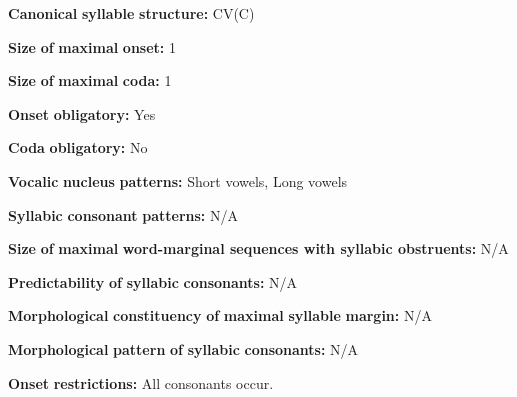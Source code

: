 \begin{styleBody}
\textbf{Canonical} \textbf{syllable} \textbf{structure:} CV(C) \citep[27-28]{Givón2011}
\end{styleBody}

\begin{styleBody}
\textbf{Size} \textbf{of} \textbf{maximal} \textbf{onset:} 1
\end{styleBody}

\begin{styleBody}
\textbf{Size} \textbf{of} \textbf{maximal} \textbf{coda:} 1
\end{styleBody}

\begin{styleBody}
\textbf{Onset} \textbf{obligatory:} Yes
\end{styleBody}

\begin{styleBody}
\textbf{Coda} \textbf{obligatory:} No
\end{styleBody}

\begin{styleBody}
\textbf{Vocalic} \textbf{nucleus} \textbf{patterns:} Short vowels, Long vowels
\end{styleBody}

\begin{styleBody}
\textbf{Syllabic} \textbf{consonant} \textbf{patterns:} N/A
\end{styleBody}

\begin{styleBody}
\textbf{Size} \textbf{of} \textbf{maximal} \textbf{word{}-marginal sequences with syllabic obstruents:} N/A
\end{styleBody}

\begin{styleBody}
\textbf{Predictability} \textbf{of} \textbf{syllabic} \textbf{consonants:} N/A
\end{styleBody}

\begin{styleBody}
\textbf{Morphological} \textbf{constituency} \textbf{of} \textbf{maximal} \textbf{syllable} \textbf{margin:} N/A
\end{styleBody}

\begin{styleBody}
\textbf{Morphological} \textbf{pattern} \textbf{of} \textbf{syllabic} \textbf{consonants:} N/A
\end{styleBody}

\begin{styleBody}
\textbf{Onset} \textbf{restrictions:} All consonants occur.
\end{styleBody}

